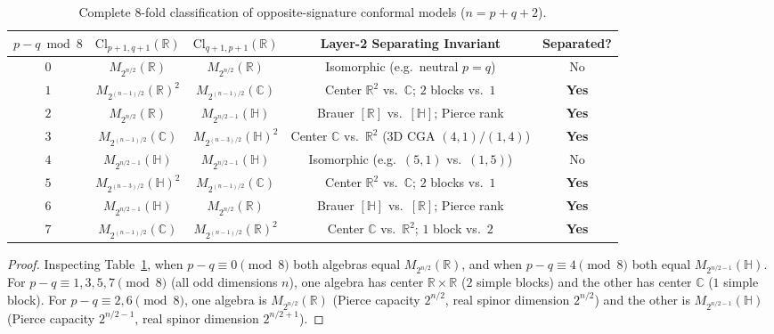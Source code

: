 \documentclass[11pt]{article}
\theoremstyle{definition}
\newcommand{\Cl}{\mathrm{Cl}}
\begin{document}
\begin{table}[ht]
\centering
\footnotesize
\renewcommand{\arraystretch}{1.25}
\begin{tabular}{@{}ccccc@{}}
\toprule
$p - q \bmod 8$ & $\Cl_{p+1,q+1}(\mathbb{R})$ & $\Cl_{q+1,p+1}(\mathbb{R})$ & Layer-2 Separating Invariant & Separated? \\
\midrule
$0$ & $M_{2^{n/2}}(\mathbb{R})$ & $M_{2^{n/2}}(\mathbb{R})$ & Isomorphic (e.g.\ neutral $p = q$) & No \\
$1$ & $M_{2^{(n-1)/2}}(\mathbb{R})^2$ & $M_{2^{(n-1)/2}}(\mathbb{C})$ & Center $\mathbb{R}^2$ vs.\ $\mathbb{C}$; $2$ blocks vs.\ $1$ & \textbf{Yes} \\
$2$ & $M_{2^{n/2}}(\mathbb{R})$ & $M_{2^{n/2-1}}(\mathbb{H})$ & Brauer $[\mathbb{R}]$ vs.\ $[\mathbb{H}]$; Pierce rank & \textbf{Yes} \\
$3$ & $M_{2^{(n-1)/2}}(\mathbb{C})$ & $M_{2^{(n-3)/2}}(\mathbb{H})^2$ & Center $\mathbb{C}$ vs.\ $\mathbb{R}^2$ (3D CGA $(4,1)/(1,4)$) & \textbf{Yes} \\
$4$ & $M_{2^{n/2-1}}(\mathbb{H})$ & $M_{2^{n/2-1}}(\mathbb{H})$ & Isomorphic (e.g.\ $(5,1)$ vs.\ $(1,5)$) & No \\
$5$ & $M_{2^{(n-3)/2}}(\mathbb{H})^2$ & $M_{2^{(n-1)/2}}(\mathbb{C})$ & Center $\mathbb{R}^2$ vs.\ $\mathbb{C}$; $2$ blocks vs.\ $1$ & \textbf{Yes} \\
$6$ & $M_{2^{n/2-1}}(\mathbb{H})$ & $M_{2^{n/2}}(\mathbb{R})$ & Brauer $[\mathbb{H}]$ vs.\ $[\mathbb{R}]$; Pierce rank & \textbf{Yes} \\
$7$ & $M_{2^{(n-1)/2}}(\mathbb{C})$ & $M_{2^{(n-1)/2}}(\mathbb{R})^2$ & Center $\mathbb{C}$ vs.\ $\mathbb{R}^2$; $1$ block vs.\ $2$ & \textbf{Yes} \\
\bottomrule
\end{tabular}
\caption{Complete $8$-fold classification of opposite-signature conformal models ($n = p + q + 2$).}
\label{tab:bott}
\end{table}

\begin{proof}
Inspecting Table~\ref{tab:bott}, when $p - q \equiv 0 \pmod{8}$ both algebras equal $M_{2^{n/2}}(\mathbb{R})$, and when $p - q \equiv 4 \pmod{8}$ both equal $M_{2^{n/2-1}}(\mathbb{H})$. For $p - q \equiv 1, 3, 5, 7 \pmod{8}$ (all odd dimensions $n$), one algebra has center $\mathbb{R} \times \mathbb{R}$ ($2$ simple blocks) and the other has center $\mathbb{C}$ ($1$ simple block). For $p - q \equiv 2, 6 \pmod{8}$, one algebra is $M_{2^{n/2}}(\mathbb{R})$ (Pierce capacity $2^{n/2}$, real spinor dimension $2^{n/2}$) and the other is $M_{2^{n/2-1}}(\mathbb{H})$ (Pierce capacity $2^{n/2-1}$, real spinor dimension $2^{n/2+1}$).
\end{proof}
\end{document}
